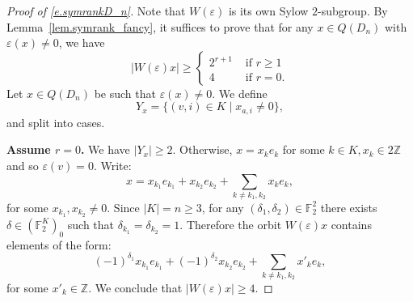 \documentclass[12pt]{amsart}
\numberwithin{equation}{section}
\theoremstyle{definition}
\newcommand{\bF}{\mathbb{F}}
\newcommand{\bZ}{\mathbb{Z}}
\newcommand{\eps}{\varepsilon}
\begin{document}
\begin{proof}[Proof of \eqref{e.symrankD_n}]
    Note that $W(\eps)$ is its own Sylow $2$-subgroup. By Lemma~\ref{lem.symrank_fancy}, it suffices to prove that for any $x\in Q(D_n)$ with $\eps(x)\neq 0$, we have $$|W(\eps) x| \geq \begin{cases}
        2^{r+1} & \text{ if }r\geq 1 \\
        4 & \text{ if }r=0.
    \end{cases}$$
     Let $x \in Q(D_{n})$ be such that $\eps(x) \neq 0$. We define $$Y_x = \{ (v,i)\in K \mid x_{a,i} \neq 0 \},$$
     and split into cases.

  \smallskip
  \textbf{Assume $r=0$.} We have $|Y_x|\geq 2$. Otherwise, $x = x_k e_k$ for some $k\in K, x_k\in 2\bZ$ and so $\eps(v) = 0$. Write:
  $$x = x_{k_1}e_{k_1} + x_{k_2}e_{k_2} + \sum_{k\neq k_1,k_2} x_k e_k,$$
  for some $x_{k_1},x_{k_2}\neq 0$.
  Since $|K| = n \geq 3$, for any $(\delta_1,\delta_2)\in \bF_2^2$ there exists $\delta\in (\bF_2^K)_0$ such that $\delta_{k_1}=\delta_{k_2}=1$. Therefore the orbit $W(\eps) x$ contains elements of the form:
  $$ (-1)^{\delta_1} x_{k_1}e_{k_1} + (-1)^{\delta_2} x_{k_2} e_{k_2} + \sum_{k\neq k_1,k_2} x'_k e_k,$$
 for some $x'_k\in \bZ$. We conclude that $|W(\eps)x| \geq  4$.


\end{proof}
\end{document}
